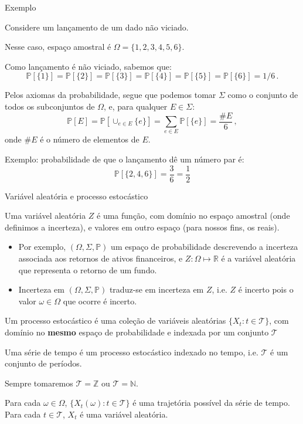 \documentclass[11pt]{beamer}
\newenvironment{halfwideitemize}{\itemize\addtolength{\itemsep}{0.5em}}{\enditemize}
\begin{document}
	\begin{frame}{Exemplo}
		\begin{halfwideitemize}
			\item Considere um lançamento de um dado não viciado.
			\item Nesse caso, espaço amostral é $\Omega = \{1,2,3,4,5,6\}$.
			\item Como lançamento é não viciado, sabemos que:
			$$\mathbb{P}[\{1\}]= \mathbb{P}[\{2\}] = \mathbb{P}[\{3\}] = \mathbb{P}[\{4\}] = \mathbb{P}[\{5\}] = \mathbb{P}[\{6\}] = 1/6 \,.$$
			\item Pelos axiomas da probabilidade, segue que podemos tomar $\Sigma$ como o conjunto de todos os subconjuntos de $\Omega$, e, para qualquer $E\in \Sigma$:
			$$\mathbb{P}[E]= \mathbb{P}[\cup_{e \in E}\{e\}] = \sum_{e \in E}\mathbb{P}[\{e\}] = \frac{\# E}{6}\, ,$$
			onde $\# E$ é o número de elementos de $E$.
			\item Exemplo: probabilidade de que o lançamento dê um número par é:
			$$\mathbb{P}[\{2,4,6\}]= \frac{3}{6} = \frac{1}{2}$$
		\end{halfwideitemize}
	\end{frame}
	
	
	\begin{frame}{Variável aleatória e processo estocástico}
		\begin{halfwideitemize}
			\item Uma {\color{blue}variável aleatória} $Z$ é uma {\color{blue}função}, com domínio no espaço amostral (onde definimos a incerteza), e valores em outro espaço (para nossos fins, os reais).
			\begin{itemize}
				\item Por exemplo, $(\Omega, \Sigma, \mathbb{P})$ um espaço de probabilidade descrevendo a incerteza associada aos retornos de ativos financeiros, e $Z: \Omega \mapsto \mathbb{R}$ é a variável aleatória que representa o retorno de um fundo.
				\item Incerteza em $(\Omega, \Sigma, \mathbb{P})$ traduz-se em incerteza em $Z$, i.e. $Z$ é incerto pois o valor $\omega \in \Omega$ que ocorre é incerto.
			\end{itemize}
			\item Um {\color{blue} processo estocástico} é uma coleção de variáveis aleatórias $\{X_t: t \in \mathcal{T}\}$, com domínio no \textbf{mesmo} espaço de probabilidade e indexada por um conjunto $\mathcal{T}$
			\item Uma {\color{blue}série de tempo} é um processo estocástico indexado no tempo, i.e. $\mathcal{T}$ é um conjunto de períodos.
			\begin{halfwideitemize}
				\item Sempre tomaremos $\mathcal{T} = \mathbb{Z}$ ou $\mathcal{T}  =\mathbb{N}$.
				\item Para cada $\omega \in \Omega$, $\{ X_t(\omega): t \in \mathcal{T} \}$ é uma trajetória {\color{blue}possível} da série de tempo. Para cada $t \in \mathcal{T}$, $X_t$ é uma variável aleatória.
			\end{halfwideitemize}
		\end{halfwideitemize}
	\end{frame}
	
\end{document}
